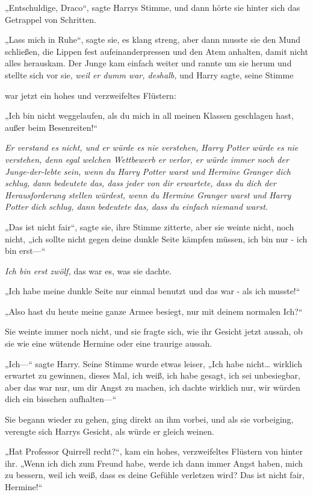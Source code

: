 {„Entschuldige, Draco“, sagte Harrys Stimme, und dann hörte sie hinter sich das Getrappel von Schritten.

„Lass mich in Ruhe“, sagte sie, es klang streng, aber dann musste sie den Mund schließen, die Lippen fest aufeinanderpressen und den Atem anhalten, damit nicht alles herauskam. Der Junge kam einfach weiter und rannte um sie herum und stellte sich vor sie, \emph{weil er dumm war, deshalb,} und Harry sagte, seine Stimme

war jetzt ein hohes und verzweifeltes Flüstern:

„Ich bin nicht weggelaufen, als du mich in all meinen Klassen geschlagen hast, außer beim Besenreiten!“

\emph{Er verstand es nicht, und er würde es nie verstehen, Harry Potter würde es nie verstehen, denn egal welchen Wettbewerb er verlor, er würde immer noch der Junge-der-lebte sein, wenn du Harry Potter warst und Hermine Granger dich schlug, dann bedeutete das, dass jeder von dir erwartete, dass du dich der Herausforderung stellen würdest, wenn du Hermine Granger warst und Harry Potter dich schlug, dann bedeutete das, dass du einfach niemand warst.}

„Das ist nicht fair“, sagte sie, ihre Stimme zitterte, aber sie weinte nicht, noch nicht, „ich sollte nicht gegen deine dunkle Seite kämpfen müssen, ich bin nur - ich bin erst—“

\emph{Ich bin erst zwölf,} das war es, was sie dachte.

„Ich habe meine dunkle Seite nur einmal benutzt und das war - als ich musste!“

„Also hast du heute meine ganze Armee besiegt, nur mit deinem normalen Ich?“

Sie weinte immer noch nicht, und sie fragte sich, wie ihr Gesicht jetzt aussah, ob sie wie eine wütende Hermine oder eine traurige aussah.

„Ich—“ sagte Harry. Seine Stimme wurde etwas leiser, „Ich habe nicht… wirklich erwartet zu gewinnen, dieses Mal, ich weiß, ich habe gesagt, ich sei unbesiegbar, aber das war nur, um dir Angst zu machen, ich dachte wirklich nur, wir würden dich ein bisschen aufhalten—“

Sie begann wieder zu gehen, ging direkt an ihm vorbei, und als sie vorbeiging, verengte sich Harrys Gesicht, als würde er gleich weinen.

„Hat Professor Quirrell recht?“, kam ein hohes, verzweifeltes Flüstern von hinter ihr. „Wenn ich dich zum Freund habe, werde ich dann immer Angst haben, mich zu bessern, weil ich weiß, dass es deine Gefühle verletzen wird? Das ist nicht fair, Hermine!“

}
